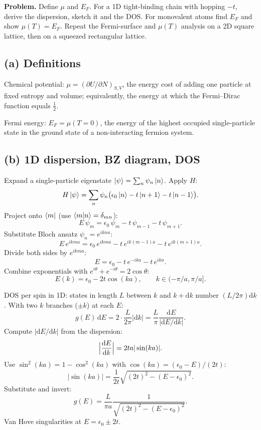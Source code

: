 \documentclass[11pt]{article}
\newcommand{\de}{\mathrm{d}}
\begin{document}
\textbf{Problem.} Define $\mu$ and $E_F$. For a 1D tight-binding chain with hopping $-t$, derive the dispersion, sketch it and the DOS. For monovalent atoms find $E_F$ and show $\mu(T)=E_F$. Repeat the Fermi-surface and $\mu(T)$ analysis on a 2D square lattice, then on a squeezed rectangular lattice.

\subsection*{(a) Definitions}

Chemical potential: $\mu = \left(\partial U/\partial N\right)_{S,V}$, the energy cost of adding one particle at fixed entropy and volume; equivalently, the energy at which the Fermi--Dirac function equals $\tfrac12$.

Fermi energy: $E_F = \mu(T=0)$, the energy of the highest occupied single-particle state in the ground state of a non-interacting fermion system.

\subsection*{(b) 1D dispersion, BZ diagram, DOS}

Expand a single-particle eigenstate $\ket{\psi}=\sum_n \psi_n\ket{n}$. Apply $H$:
\[
H\ket{\psi} = \sum_n \psi_n\bigl(\epsilon_0\ket{n} - t\ket{n+1} - t\ket{n-1}\bigr).
\]
Project onto $\bra{m}$ (use $\braket{m|n}=\delta_{mn}$):
\[
E\,\psi_m = \epsilon_0\,\psi_m - t\,\psi_{m-1} - t\,\psi_{m+1}.
\]
Substitute Bloch ansatz $\psi_n = e^{ikna}$:
\[
E\,e^{ikma} = \epsilon_0\,e^{ikma} - t\,e^{ik(m-1)a} - t\,e^{ik(m+1)a}.
\]
Divide both sides by $e^{ikma}$:
\[
E = \epsilon_0 - t\,e^{-ika} - t\,e^{ika}.
\]
Combine exponentials with $e^{i\theta}+e^{-i\theta}=2\cos\theta$:
\[
\boxed{\;E(k) = \epsilon_0 - 2t\cos(ka),\qquad k\in(-\pi/a,\pi/a].\;}
\label{eq:tb1d}
\]

DOS per spin in 1D: states in length $L$ between $k$ and $k+\de k$ number $(L/2\pi)\de k$. With two $k$ branches ($\pm k$) at each $E$:
\[
g(E)\,\de E = 2\cdot\frac{L}{2\pi}|\de k| = \frac{L}{\pi}\frac{\de E}{|\de E/\de k|}.
\]
Compute $|\de E/\de k|$ from the dispersion:
\[
\Bigl|\frac{\de E}{\de k}\Bigr| = 2ta|\sin(ka)|.
\]
Use $\sin^2(ka) = 1 - \cos^2(ka)$ with $\cos(ka) = (\epsilon_0-E)/(2t)$:
\[
|\sin(ka)| = \frac{1}{2t}\sqrt{(2t)^2 - (E-\epsilon_0)^2}.
\]
Substitute and invert:
\[
g(E) = \frac{L}{\pi a}\frac{1}{\sqrt{(2t)^2 - (E-\epsilon_0)^2}}.
\]
Van Hove singularities at $E=\epsilon_0\pm 2t$.
\end{document}
